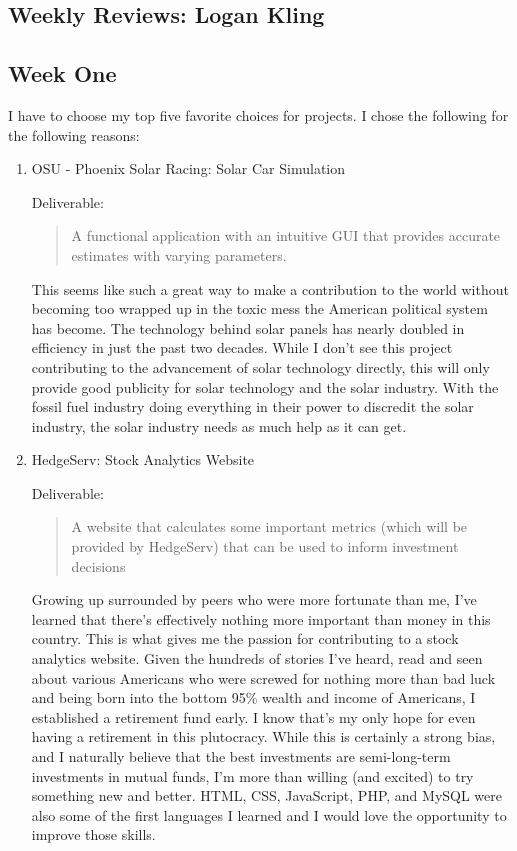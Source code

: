 \begin{singlespace}
\section{Weekly Reviews: Logan Kling}
\subsection{Week One}
I have to choose my top five favorite choices for projects.
I chose the following for the following reasons:
\begin{enumerate}
	\item OSU - Phoenix Solar Racing: Solar Car Simulation
	
	Deliverable:
	\begin{quote}
	    A functional application with an intuitive GUI that provides accurate estimates with varying parameters.
    	\cite{SolarCarSimulation}
	\end{quote}
	
	This seems like such a great way to make a contribution to the world without becoming too wrapped up in the toxic mess the American political system has become.
	The technology behind solar panels has nearly doubled in efficiency in just the past two decades.
	While I don't see this project contributing to the advancement of solar technology directly, this will only provide good publicity for solar technology and the solar industry.
	With the fossil fuel industry doing everything in their power to discredit the solar industry, the solar industry needs as much help as it can get.
	
	\vspace{0.1in}
	\item HedgeServ: Stock Analytics Website
	
	Deliverable:
	\begin{quote}
    	A website that calculates some important metrics (which will be provided by HedgeServ) that can be used to inform investment decisions
    	\cite{StockAnalyticsWebsite}
	\end{quote}
	
	Growing up surrounded by peers who were more fortunate than me, I've learned that there's effectively nothing more important than money in this country.
	This is what gives me the passion for contributing to a stock analytics website.
	Given the hundreds of stories I've heard, read and seen about various Americans who were screwed for nothing more than bad luck and being born into the bottom 95\% wealth and income of Americans, I established a retirement fund early.
	I know that's my only hope for even having a retirement in this plutocracy.
	While this is certainly a strong bias, and I naturally believe that the best investments are semi-long-term investments in mutual funds, I'm more than willing (and excited) to try something new and better.
	HTML, CSS, JavaScript, PHP, and MySQL were also some of the first languages I learned and I would love the opportunity to improve those skills.
	

\end{enumerate}
\end{singlespace}
